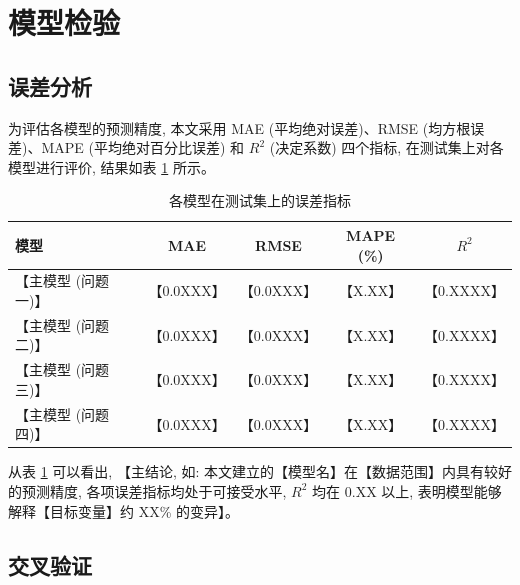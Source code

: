 
\section{模型检验}

\subsection{误差分析}

为评估各模型的预测精度, 本文采用 MAE (平均绝对误差)、RMSE (均方根误差)、MAPE (平均绝对百分比误差) 和 $R^2$ (决定系数) 四个指标, 在测试集上对各模型进行评价, 结果如表 \ref{tab:error_metrics} 所示。

\begin{table}[htbp]
  \centering
  \caption{各模型在测试集上的误差指标}
  \label{tab:error_metrics}
  \begin{tabular}{lcccc}
    \toprule
    \textbf{模型} & \textbf{MAE} & \textbf{RMSE} & \textbf{MAPE (\%)} & \textbf{$R^2$} \\
    \midrule
    【主模型 (问题一)】 & 【0.0XXX】 & 【0.0XXX】 & 【X.XX】 & 【0.XXXX】 \\
    【主模型 (问题二)】 & 【0.0XXX】 & 【0.0XXX】 & 【X.XX】 & 【0.XXXX】 \\
    【主模型 (问题三)】 & 【0.0XXX】 & 【0.0XXX】 & 【X.XX】 & 【0.XXXX】 \\
    【主模型 (问题四)】 & 【0.0XXX】 & 【0.0XXX】 & 【X.XX】 & 【0.XXXX】 \\
    \bottomrule
  \end{tabular}
\end{table}

从表 \ref{tab:error_metrics} 可以看出, 【主结论, 如: 本文建立的【模型名】在【数据范围】内具有较好的预测精度, 各项误差指标均处于可接受水平, $R^2$ 均在 0.XX 以上, 表明模型能够解释【目标变量】约 XX\% 的变异】。

\subsection{交叉验证}

